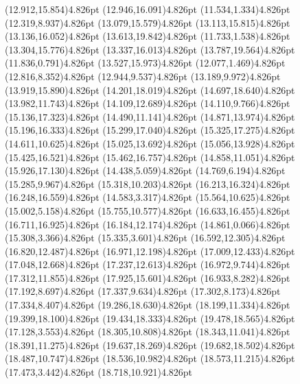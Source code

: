 \documentclass[10pt]{article}
\begin{document}
{{\qdisk(12.912,15.854){4.826pt}%
\qdisk(12.946,16.091){4.826pt}%
\qdisk(11.534,1.334){4.826pt}%
\qdisk(12.319,8.937){4.826pt}%
\qdisk(13.079,15.579){4.826pt}%
\qdisk(13.113,15.815){4.826pt}%
\qdisk(13.136,16.052){4.826pt}%
\qdisk(13.613,19.842){4.826pt}%
\qdisk(11.733,1.538){4.826pt}%
\qdisk(13.304,15.776){4.826pt}%
\qdisk(13.337,16.013){4.826pt}%
\qdisk(13.787,19.564){4.826pt}%
\qdisk(11.836,0.791){4.826pt}%
\qdisk(13.527,15.973){4.826pt}%
\qdisk(12.077,1.469){4.826pt}%
\qdisk(12.816,8.352){4.826pt}%
\qdisk(12.944,9.537){4.826pt}%
\qdisk(13.189,9.972){4.826pt}%
\qdisk(13.919,15.890){4.826pt}%
\qdisk(14.201,18.019){4.826pt}%
\qdisk(14.697,18.640){4.826pt}%
\qdisk(13.982,11.743){4.826pt}%
\qdisk(14.109,12.689){4.826pt}%
\qdisk(14.110,9.766){4.826pt}%
\qdisk(15.136,17.323){4.826pt}%
\qdisk(14.490,11.141){4.826pt}%
\qdisk(14.871,13.974){4.826pt}%
\qdisk(15.196,16.333){4.826pt}%
\qdisk(15.299,17.040){4.826pt}%
\qdisk(15.325,17.275){4.826pt}%
\qdisk(14.611,10.625){4.826pt}%
\qdisk(15.025,13.692){4.826pt}%
\qdisk(15.056,13.928){4.826pt}%
\qdisk(15.425,16.521){4.826pt}%
\qdisk(15.462,16.757){4.826pt}%
\qdisk(14.858,11.051){4.826pt}%
\qdisk(15.926,17.130){4.826pt}%
\qdisk(14.438,5.059){4.826pt}%
\qdisk(14.769,6.194){4.826pt}%
\qdisk(15.285,9.967){4.826pt}%
\qdisk(15.318,10.203){4.826pt}%
\qdisk(16.213,16.324){4.826pt}%
\qdisk(16.248,16.559){4.826pt}%
\qdisk(14.583,3.317){4.826pt}%
\qdisk(15.564,10.625){4.826pt}%
\qdisk(15.002,5.158){4.826pt}%
\qdisk(15.755,10.577){4.826pt}%
\qdisk(16.633,16.455){4.826pt}%
\qdisk(16.711,16.925){4.826pt}%
\qdisk(16.184,12.174){4.826pt}%
\qdisk(14.861,0.066){4.826pt}%
\qdisk(15.308,3.366){4.826pt}%
\qdisk(15.335,3.601){4.826pt}%
\qdisk(16.592,12.305){4.826pt}%
\qdisk(16.820,12.487){4.826pt}%
\qdisk(16.971,12.198){4.826pt}%
\qdisk(17.009,12.433){4.826pt}%
\qdisk(17.048,12.668){4.826pt}%
\qdisk(17.237,12.613){4.826pt}%
\qdisk(16.972,9.744){4.826pt}%
\qdisk(17.312,11.855){4.826pt}%
\qdisk(17.925,15.601){4.826pt}%
\qdisk(16.933,8.282){4.826pt}%
\qdisk(17.192,8.697){4.826pt}%
\qdisk(17.337,9.634){4.826pt}%
\qdisk(17.302,8.173){4.826pt}%
\qdisk(17.334,8.407){4.826pt}%
\qdisk(19.286,18.630){4.826pt}%
\qdisk(18.199,11.334){4.826pt}%
\qdisk(19.399,18.100){4.826pt}%
\qdisk(19.434,18.333){4.826pt}%
\qdisk(19.478,18.565){4.826pt}%
\qdisk(17.128,3.553){4.826pt}%
\qdisk(18.305,10.808){4.826pt}%
\qdisk(18.343,11.041){4.826pt}%
\qdisk(18.391,11.275){4.826pt}%
\qdisk(19.637,18.269){4.826pt}%
\qdisk(19.682,18.502){4.826pt}%
\qdisk(18.487,10.747){4.826pt}%
\qdisk(18.536,10.982){4.826pt}%
\qdisk(18.573,11.215){4.826pt}%
\qdisk(17.473,3.442){4.826pt}%
\qdisk(18.718,10.921){4.826pt}%
}}
\end{document}
